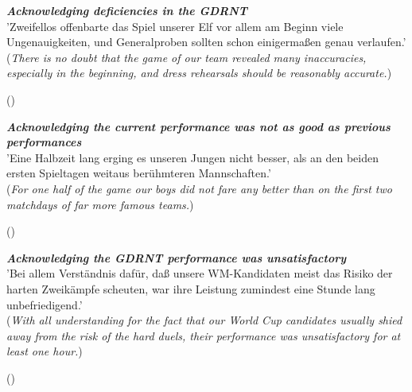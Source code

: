 \begin{displayquote}
\begin{small}
\textbf{\textit{Acknowledging deficiencies in the GDRNT}}\\
'Zweifellos offenbarte das Spiel unserer Elf vor allem am Beginn viele Ungenauigkeiten, und Generalproben sollten schon einigermaßen genau verlaufen.'\\
(\textit{There is no doubt that the game of our team revealed many inaccuracies, especially in the beginning, and dress rehearsals should be reasonably accurate.})\
\begin{flushright}\footnotesize (\cite{nd19740530})\end{flushright}
\end{small}
\end{displayquote}

\begin{displayquote}
\begin{small}
\textbf{\textit{Acknowledging the current performance was not as good as previous performances}}\\
'Eine Halbzeit lang erging es unseren Jungen nicht besser, als an den beiden ersten Spieltagen weitaus berühmteren Mannschaften.'\\
(\textit{For one half of the game our boys did not fare any better than on the first two matchdays of far more famous teams.})\
\begin{flushright}\footnotesize (\cite{nd19740615})\end{flushright}
\end{small}
\end{displayquote}

\begin{displayquote}
\begin{small}
\textbf{\textit{Acknowledging the GDRNT performance was unsatisfactory}}\\
'Bei allem Verständnis dafür, daß unsere WM-Kandidaten meist das Risiko der harten Zweikämpfe scheuten, war ihre Leistung zumindest eine Stunde lang unbefriedigend.'\\
(\textit{With all understanding for the fact that our World Cup candidates usually shied away from the risk of the hard duels, their performance was unsatisfactory for at least one hour.})\
\begin{flushright}\footnotesize (\cite{nd19740524})\end{flushright}
\end{small}
\end{displayquote}

